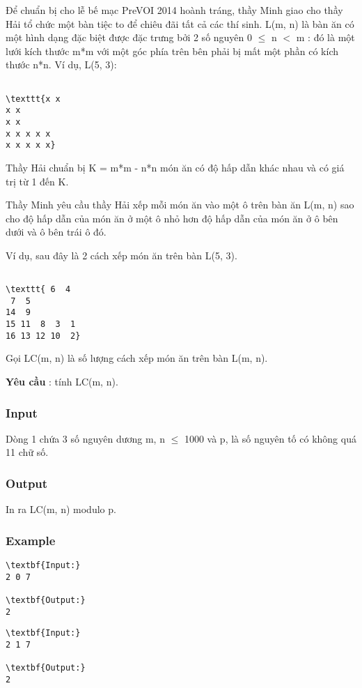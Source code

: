 

Để chuẩn bị cho lễ bế mạc PreVOI 2014 hoành tráng, thầy Minh giao cho thầy Hải tổ chức một bàn tiệc to để chiêu đãi tất cả các thí sinh. L(m, n) là bàn ăn có một hình dạng đặc biệt được đặc trưng bởi 2 số nguyên 0  $\le$  n $<$ m : đó là một lưới kích thước m*m với một góc phía trên bên phải bị mất một phần có kích thước n*n. Ví dụ, L(5, 3):
\begin{verbatim}

\texttt{x x
x x
x x
x x x x x
x x x x x}\end{verbatim}

Thầy Hải chuẩn bị K = m*m - n*n món ăn có độ hấp dẫn khác nhau và có giá trị từ 1 đến K.

Thầy Minh yêu cầu thầy Hải xếp mỗi món ăn vào một ô trên bàn ăn L(m, n) sao cho độ hấp dẫn của món ăn ở một ô nhỏ hơn độ hấp dẫn của món ăn ở ô bên dưới và ô bên trái ô đó.

Ví dụ, sau đây là 2 cách xếp món ăn trên bàn L(5, 3).
\begin{verbatim}

\texttt{ 6  4
 7  5
14  9
15 11  8  3  1
16 13 12 10  2}\end{verbatim}

Gọi LC(m, n) là số lượng cách xếp món ăn trên bàn L(m, n).

\textbf{Yêu cầu } : tính LC(m, n).

\subsubsection{Input}

Dòng 1 chứa 3 số nguyên dương m, n  $\le$  1000 và p, là số nguyên tố có không quá 11 chữ số.

\subsubsection{Output}

In ra LC(m, n) modulo p.

\subsubsection{Example}
\begin{verbatim}
\textbf{Input:}
2 0 7

\textbf{Output:}
2\end{verbatim}
\begin{verbatim}
\textbf{Input:}
2 1 7

\textbf{Output:}
2\end{verbatim}
